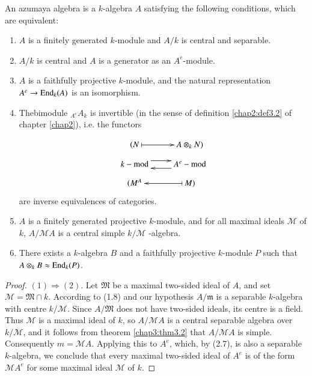  \begin{thmanddef}\label{chap3:thm4.1}%
An azumaya algebra is a $k$-algebra $A$ satisfying the following
conditions, which are equivalent: 
 \begin{enumerate}[(1)]
\item $A$ is a finitely generated $k$-module and $A/k$
  is central and separable. 

\item $A/k$ is central and $A$ is a  generator as
  an $A^e$-module. 

\item $A$ is a faithfully projective $k$-module, and the
  natural representation $A^e \to \operatorname{End}_k (A)$ is an
  isomorphism. 

\item The\pageoriginale bimodule $_{{A}^e} A_k$ is invertible (in the
  sense of definition \ref{chap2:def3.2} of chapter \ref{chap2}),
  i.e. the functors  

\[
\xymatrix@R=-1.3cm{
(M^A & M \ar@{|->}[l])\\
k-{\rm mod} \ar@<1ex>[r] & A^e-{\rm mod} \ar@<1ex>[l]\\
(N \ar@{|->}[r] & A \otimes_k N)
}
\]
are inverse equivalences of categories.

\item $A$ is a finitely generated projective $k$-module, and for all
  maximal ideals $\mathscr{M}$ of $k$, $A/ \mathscr{M}A$ is a central
  simple $k / \mathscr{M}$ -algebra. 

\item There exists a $k$-algebra $B$ and a faithfully projective
  $k$-module $P$ such that $A \otimes_k B \approx \operatorname{End}_k (P)$. 
 \end{enumerate}      
 \end{thmanddef}

 \begin{proof}
$(1) \Rightarrow (2)$. Let $\mathfrak{M}$ be a maximal two-sided ideal of $A$,
   and set $\mathscr{M} = \mathfrak{M} \cap k$. According to (1.8) and our
   hypothesis $A/\mathfrak{m}$ is a separable $k$-algebra with centre $k /
   \mathscr{M}$. Since $A /\mathfrak{M}$ does not have two-sided ideals, its
   centre is a field. Thus $\mathscr{M}$ is a maximal ideal of $k$, so
   $A/ \mathscr{M} A$ is a central separable algebra over $k /
   \mathscr{M}$, and it follows from theorem \ref{chap3:thm3.2} that
   $A/ \mathscr{M} 
   A$ is simple. Consequently $m = \mathscr{M}A$. Applying this to
   $A^e$, which, by (2.7), is also a separable $k$-algebra, we
   conclude that every maximal two-sided ideal of  $A^e$ is of the
   form $\mathscr{M} A^e$ for some maximal ideal $\mathscr{M}$ of $k$.  
  \end{proof}        

